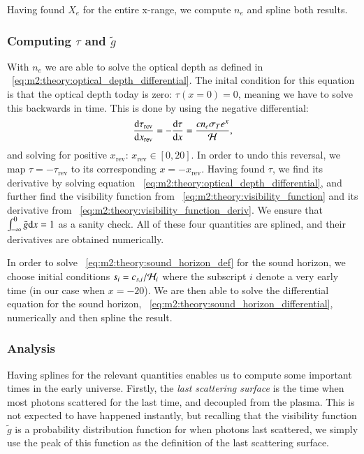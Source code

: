     Having found $X_e$ for the entire x-range, we compute $n_e$ and spline both results.

\subsubsection{Computing $\tau$ and $\tilde{g}$}\label{sec:m2:methods:tau_and_g}
    With $n_e$ we are able to solve the optical depth as defined in ~\cref{eq:m2:theory:optical_depth_differential}. The inital condition for this equation is that the optical depth today is zero: $\tau(x=0)=0$, meaning we have to solve this backwards in time. This is done by using the negative differential:
    \begin{equation}
        \dv{\tau_\mathrm{rev}}{x_\mathrm{rev}} = -\dv{\tau}{x} = \frac{cn_e\sigma_Te^x}{\mathcal{H}},
    \end{equation}
    and solving for positive $x_\mathrm{rev}$: $x_\mathrm{rev}\in[0,20]$. In order to undo this reversal, we map $\tau=-\tau_\mathrm{rev}$ to its corresponding $x=-x_\mathrm{rev}$. Having found $\tau$, we find its derivative by solving equation ~\cref{eq:m2:theory:optical_depth_differential}, and further find the visibility function from ~\cref{eq:m2:theory:visibility_function} and its derivative from ~\cref{eq:m2:theory:visibility_function_deriv}. We ensure that $\int_{-\infty}^0\tilde{g}\mathrm{d} x=1$ as a sanity check. All of these four quantities are splined, and their derivatives are obtained numerically.

    In order to solve ~\cref{eq:m2:theory:sound_horizon_def} for the sound horizon, we choose initial conditions $s_i = c_{s,i}/{\mathcal{H}_i}$ where the subscript $i$ denote a very early time (in our case when $x=-20$). We are then able to solve the differential equation for the sound horizon, ~\cref{eq:m2:theory:sound_horizon_differential}, numerically and then spline the result. 


\subsubsection{Analysis}\label{sec:m2:methods:analysis}
    Having splines for the relevant quantities enables us to compute some important times in the early universe. Firstly, the \textit{last scattering surface} is the time when most photons scattered for the last time, and decoupled from the plasma. This is not expected to have happened instantly, but recalling that the visibility function $\tilde{g}$ is a probability distribution function for when photons last scattered, we simply use the peak of this function as the definition of the last scattering surface. 

